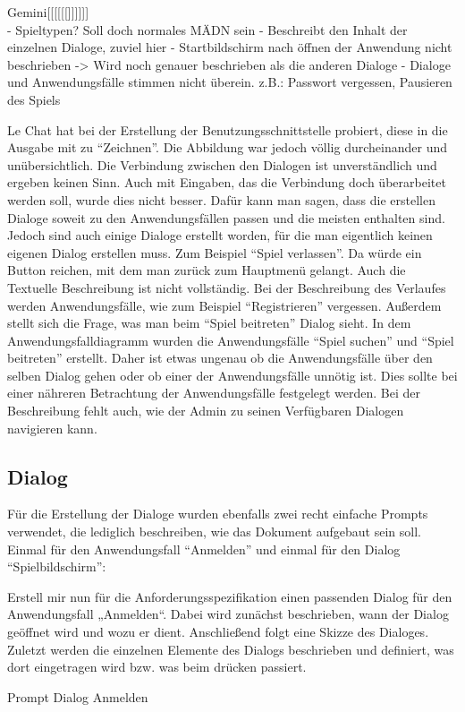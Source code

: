 Gemini[[[[[[]]]]]]\\
    - Spieltypen? Soll doch normales MÄDN sein
    - Beschreibt den Inhalt der einzelnen Dialoge, zuviel hier
    - Startbildschirm nach öffnen der Anwendung nicht beschrieben -> Wird noch genauer beschrieben als die anderen Dialoge
    - Dialoge und Anwendungsfälle stimmen nicht überein. z.B.: Passwort vergessen, Pausieren des Spiels

Le Chat hat bei der Erstellung der Benutzungsschnittstelle probiert, diese in die Ausgabe mit zu ``Zeichnen''. Die Abbildung war jedoch 
völlig durcheinander und unübersichtlich. Die Verbindung zwischen den Dialogen ist unverständlich und ergeben keinen Sinn. Auch mit Eingaben, 
das die Verbindung doch überarbeitet werden soll, wurde dies nicht besser. Dafür kann man sagen, dass die erstellen Dialoge soweit zu den 
Anwendungsfällen passen und die meisten enthalten sind. Jedoch sind auch einige Dialoge erstellt worden, für die man eigentlich keinen eigenen
Dialog erstellen muss. Zum Beispiel ``Spiel verlassen''. Da würde ein Button reichen, mit dem man zurück zum Hauptmenü gelangt. Auch die 
Textuelle Beschreibung ist nicht vollständig. Bei der Beschreibung des Verlaufes werden Anwendungsfälle, wie zum Beispiel ``Registrieren'' vergessen.
Außerdem stellt sich die Frage, was man beim ``Spiel beitreten'' Dialog sieht. In dem Anwendungsfalldiagramm wurden die Anwendungsfälle ``Spiel suchen'' 
und ``Spiel beitreten'' erstellt. Daher ist etwas ungenau ob die Anwendungsfälle über den selben Dialog gehen oder ob einer der Anwendungsfälle unnötig 
ist. Dies sollte bei einer nähreren Betrachtung der Anwendungsfälle festgelegt werden. Bei der Beschreibung fehlt auch, wie der Admin zu seinen 
Verfügbaren Dialogen navigieren kann.


\subsection*{Dialog}

Für die Erstellung der Dialoge wurden ebenfalls zwei recht einfache Prompts verwendet, die lediglich beschreiben, wie das Dokument 
aufgebaut sein soll. Einmal für den Anwendungsfall ``Anmelden'' und einmal für den Dialog ``Spielbildschirm'':

\begin{prompt}[H]
    \begin{tcolorbox}[colback=gray!20, colframe=gray!20, boxrule=0pt, sharp corners] 
        Erstell mir nun für die Anforderungsspezifikation einen passenden Dialog für den Anwendungsfall „Anmelden“. Dabei wird zunächst 
        beschrieben, wann der Dialog geöffnet wird und wozu er dient. Anschließend folgt eine Skizze des Dialoges. Zuletzt werden die 
        einzelnen Elemente des Dialogs beschrieben und definiert, was dort eingetragen wird bzw. was beim drücken passiert.
        \vfill
    \end{tcolorbox}
    \caption{Prompt Dialog Anmelden}
    \label{Prompt Dialog Anmelden}
\end{prompt}

